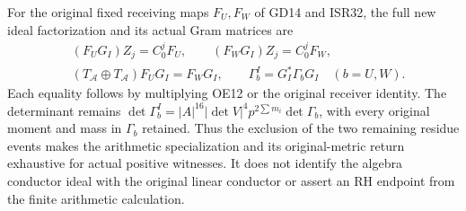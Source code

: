 For the original fixed receiving maps $F_U,F_W$ of GD14 and ISR32,
the full new ideal factorization and its actual Gram matrices are
\begin{equation}
 \begin{aligned}
 &(F_U G_I)Z_j=C_0^jF_U,\qquad (F_W G_I)Z_j=C_0^jF_W,\\
 &(T_{\mathcal A}\oplus T_{\mathcal A})F_U G_I=F_WG_I,
 \qquad \Gamma_b^I=G_I^*\Gamma_b G_I\quad(b=U,W).
 \end{aligned}                                          \tag{OE18}
\end{equation}
Each equality follows by multiplying OE12 or the original receiver
identity. The determinant remains
$\det\Gamma_b^I=|A|^{16}|\det V|^4p^{2\sum m_i}\det\Gamma_b$,
with every original moment and mass in $\Gamma_b$ retained.
Thus the exclusion of the two remaining residue events makes the
arithmetic specialization and its original-metric return exhaustive
for actual positive witnesses. It does not identify the algebra
conductor ideal with the original linear conductor or assert an
RH endpoint from the finite arithmetic calculation.
